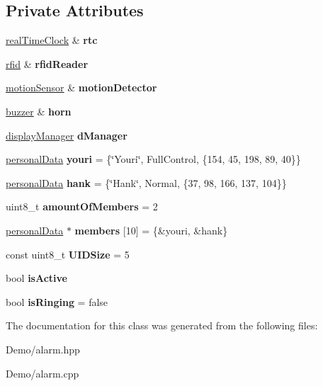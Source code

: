 \subsection*{Private Attributes}
\begin{DoxyCompactItemize}
\item 
\mbox{\label{classalarm_afec7be3c6ef6cefe5e0bc9b8cd2169e9}} 
\mbox{\hyperlink{classreal_time_clock}{real\+Time\+Clock}} \& {\bfseries rtc}
\item 
\mbox{\label{classalarm_a1c53aa85791e56c7a811e218f051df82}} 
\mbox{\hyperlink{classrfid}{rfid}} \& {\bfseries rfid\+Reader}
\item 
\mbox{\label{classalarm_a25b4c008275f022756119e1250b90a98}} 
\mbox{\hyperlink{classmotion_sensor}{motion\+Sensor}} \& {\bfseries motion\+Detector}
\item 
\mbox{\label{classalarm_a8d87a3c8c7b8cce58ad2cee9fa0a4310}} 
\mbox{\hyperlink{classbuzzer}{buzzer}} \& {\bfseries horn}
\item 
\mbox{\label{classalarm_a4fd0e362b51c0d6cab5fa7d30a38af8e}} 
\mbox{\hyperlink{classdisplay_manager}{display\+Manager}} {\bfseries d\+Manager}
\item 
\mbox{\label{classalarm_aa85f0f117c2aa100765e7be92e7e4514}} 
\mbox{\hyperlink{structpersonal_data}{personal\+Data}} {\bfseries youri} = \{\char`\"{}Youri\char`\"{}, Full\+Control, \{154, 45, 198, 89, 40\}\}
\item 
\mbox{\label{classalarm_ad584a835047a5a45c84f20b250406dc4}} 
\mbox{\hyperlink{structpersonal_data}{personal\+Data}} {\bfseries hank} = \{\char`\"{}Hank\char`\"{}, Normal, \{37, 98, 166, 137, 104\}\}
\item 
\mbox{\label{classalarm_a0df368fa9b7215aed85c20bf01158a85}} 
uint8\+\_\+t {\bfseries amount\+Of\+Members} = 2
\item 
\mbox{\label{classalarm_acbf7ed273a5a1921d884ae924d07dd33}} 
\mbox{\hyperlink{structpersonal_data}{personal\+Data}} $\ast$ {\bfseries members} \mbox{[}10\mbox{]} = \{\&youri, \&hank\}
\item 
\mbox{\label{classalarm_a60b21367926834a5a178ea975667f8b4}} 
const uint8\+\_\+t {\bfseries U\+I\+D\+Size} = 5
\item 
\mbox{\label{classalarm_a6437d709cf6639065cffad1018b637be}} 
bool {\bfseries is\+Active}
\item 
\mbox{\label{classalarm_a2418a1fd302f477edd563e6ffb5c407c}} 
bool {\bfseries is\+Ringing} = false
\end{DoxyCompactItemize}


The documentation for this class was generated from the following files\+:\begin{DoxyCompactItemize}
\item 
Demo/alarm.\+hpp\item 
Demo/alarm.\+cpp\end{DoxyCompactItemize}
